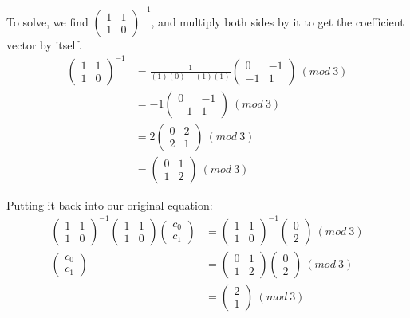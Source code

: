 \documentclass[10pt,letterpaper]{report}
\begin{document}
\begin{enumerate}
	To solve, we find $\begin{pmatrix}
	1 & 1 \\ 1 & 0
	\end{pmatrix}^{-1}$, and multiply both sides by it to get the coefficient vector
	by itself.
	\begin{align*}
	\begin{pmatrix}
	1 & 1 \\ 1 & 0
	\end{pmatrix}^{-1} &= \frac{1}{(1)(0) - (1)(1)} \begin{pmatrix}
	0 & -1 \\ -1 & 1
	\end{pmatrix} \ (mod\ 3)
	\\
	&= -1 \begin{pmatrix}
	0 & -1 \\ -1 & 1
	\end{pmatrix} \ (mod\ 3)
	\\
	&= 2 \begin{pmatrix}
	0 & 2 \\ 2 & 1
	\end{pmatrix} \ (mod\ 3)
	\\
	&= \begin{pmatrix}
	0 & 1 \\ 1 & 2
	\end{pmatrix} \ (mod\ 3)
	\end{align*}
	
	Putting it back into our original equation:
	\begin{align*}
	\begin{pmatrix}
	1 & 1 \\ 1 & 0
	\end{pmatrix}^{-1}
	\begin{pmatrix}
	1 & 1 \\ 1 & 0
	\end{pmatrix}
	\begin{pmatrix}
	c_0 \\ c_1
	\end{pmatrix}
	&=
	\begin{pmatrix}
	1 & 1 \\ 1 & 0
	\end{pmatrix}^{-1}
	\begin{pmatrix}
	0 \\ 2
	\end{pmatrix}
	\ (mod\ 3)	
	\\
	\begin{pmatrix}
	c_0 \\ c_1
	\end{pmatrix}
	&=
	\begin{pmatrix}
	0 & 1 \\ 1 & 2
	\end{pmatrix}
	\begin{pmatrix}
	0 \\ 2
	\end{pmatrix}
	\ (mod\ 3)
	\\
	&=
	\begin{pmatrix}
	2 \\ 1
	\end{pmatrix} \ (mod\ 3)
	\end{align*}
	

\end{enumerate}
\end{document}
